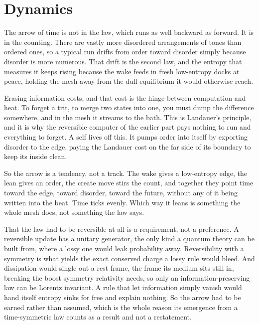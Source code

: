 \section{Dynamics}

The arrow of time is not in the law, which runs as well backward as forward. It is in the counting. There are vastly more disordered arrangements of tones than ordered ones, so a typical run drifts from order toward disorder simply because disorder is more numerous. That drift is the second law, and the entropy that measures it keeps rising because the wake feeds in fresh low-entropy docks at peace, holding the mesh away from the dull equilibrium it would otherwise reach.

Erasing information costs, and that cost is the hinge between computation and heat. To forget a trit, to merge two states into one, you must dump the difference somewhere, and in the mesh it streams to the bath. This is Landauer's principle, and it is why the reversible computer of the earlier part pays nothing to run and everything to forget. A self lives off this. It pumps order into itself by exporting disorder to the edge, paying the Landauer cost on the far side of its boundary to keep its inside clean.

So the arrow is a tendency, not a track. The wake gives a low-entropy edge, the lean gives an order, the create move stirs the count, and together they point time toward the edge, toward disorder, toward the future, without any of it being written into the beat. Time ticks evenly. Which way it leans is something the whole mesh does, not something the law says.

That the law had to be reversible at all is a requirement, not a preference. A reversible update has a unitary generator, the only kind a quantum theory can be built from, where a lossy one would leak probability away. Reversibility with a symmetry is what yields the exact conserved charge a lossy rule would bleed. And dissipation would single out a rest frame, the frame its medium sits still in, breaking the boost symmetry relativity needs, so only an information-preserving law can be Lorentz invariant. A rule that let information simply vanish would hand itself entropy sinks for free and explain nothing. So the arrow had to be earned rather than assumed, which is the whole reason its emergence from a time-symmetric law counts as a result and not a restatement.
